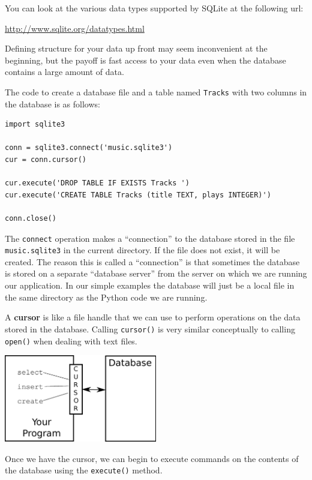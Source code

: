 \documentclass[11pt]{book}
\begin{document}
You can look at the various data types supported by SQLite
at the following url:

\url{http://www.sqlite.org/datatypes.html}

Defining structure for your data up front may seem inconvenient
at the beginning, but the payoff is fast access to your data 
even when the database contains a large amount of data.

The code to create a database file and a table 
named {\tt Tracks} with two columns in the 
database is as follows:

\beforeverb
\begin{verbatim}
import sqlite3

conn = sqlite3.connect('music.sqlite3')
cur = conn.cursor()

cur.execute('DROP TABLE IF EXISTS Tracks ')
cur.execute('CREATE TABLE Tracks (title TEXT, plays INTEGER)')

conn.close()
\end{verbatim}
\afterverb
%
The {\tt connect} operation makes a ``connection'' to the database 
stored in the file {\tt music.sqlite3} in the current directory.   If
the file does not exist, it will be created.  The reason this
is called a ``connection'' is that sometimes the database is stored
on a separate ``database server'' from the server on which we 
are running our application.  In our simple examples 
the database will just be a local file in the same directory
as the Python code we are running.

A {\bf cursor} is like a file handle that we can use to perform
operations on the data stored in the database.  Calling 
{\tt cursor()} is very similar conceptually to calling
{\tt open()} when dealing with text files.

\beforefig
\centerline{\includegraphics[height=1.50in]{figs2/cursor.eps}}
\afterfig

Once we have the cursor, we can begin to execute 
commands on the contents of the database using the {\tt execute()}
method.
\end{document}
